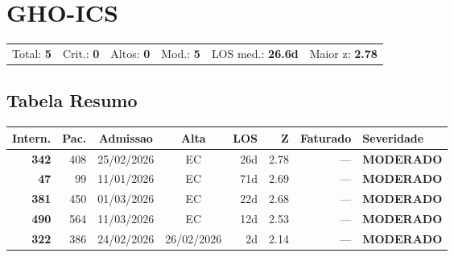 \documentclass[a4paper,10pt]{article}
\begin{document}
\newpage

\clearpage
\section{GHO-ICS}
\begin{tcolorbox}[colback=lightblue,colframe=jcubeblue,title={\textbf{Resumo --- GHO-ICS}}]
\begin{tabular}{ll@{\quad}ll@{\quad}ll}
Total: \textbf{5} &
Crit.: \textcolor{anomred}{\textbf{0}} &
Altos: \textcolor{anomorange}{\textbf{0}} &
Mod.: \textcolor{anomyellow}{\textbf{5}} &
LOS med.: \textbf{26.6d} &
Maior z: \textbf{2.78} \\


\end{tabular}
\end{tcolorbox}

\subsection{Tabela Resumo}
\begin{center}
\begin{longtable}{>{\scriptsize}r>{\scriptsize}r>{\scriptsize}c>{\scriptsize}c>{\scriptsize}r>{\scriptsize}r>{\scriptsize}r>{\scriptsize}l}
\toprule
\textbf{Intern.} & \textbf{Pac.} & \textbf{Admissao} & \textbf{Alta} & \textbf{LOS} & \textbf{Z} & \textbf{Faturado} & \textbf{Severidade} \\
\midrule
\endhead
\bottomrule
\endfoot

\textcolor{anomyellow}{\textbf{342}} & 408 & 25/02/2026 & \textcolor{anomorange}{EC} & 26d & \textcolor{anomyellow}{2.78} & --- & \textcolor{anomyellow}{\textbf{MODERADO}} \\

\textcolor{anomyellow}{\textbf{47}} & 99 & 11/01/2026 & \textcolor{anomorange}{EC} & 71d & \textcolor{anomyellow}{2.69} & --- & \textcolor{anomyellow}{\textbf{MODERADO}} \\

\textcolor{anomyellow}{\textbf{381}} & 450 & 01/03/2026 & \textcolor{anomorange}{EC} & 22d & \textcolor{anomyellow}{2.68} & --- & \textcolor{anomyellow}{\textbf{MODERADO}} \\

\textcolor{anomyellow}{\textbf{490}} & 564 & 11/03/2026 & \textcolor{anomorange}{EC} & 12d & \textcolor{anomyellow}{2.53} & --- & \textcolor{anomyellow}{\textbf{MODERADO}} \\

\textcolor{anomyellow}{\textbf{322}} & 386 & 24/02/2026 & 26/02/2026 & 2d & \textcolor{anomyellow}{2.14} & --- & \textcolor{anomyellow}{\textbf{MODERADO}} \\

\end{longtable}\end{center}
\end{document}
